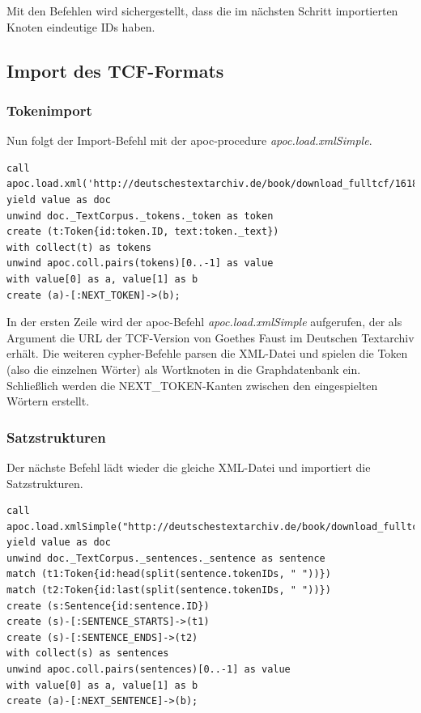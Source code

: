 Mit den Befehlen wird sichergestellt, dass die im nächsten Schritt
importierten Knoten eindeutige IDs haben.

\hypertarget{import-des-tcf-formats}{%
\subsection{Import des TCF-Formats}\label{import-des-tcf-formats}}

\hypertarget{tokenimport}{%
\subsubsection{Tokenimport}\label{tokenimport}}

Nun folgt der Import-Befehl mit der apoc-procedure
\emph{apoc.load.xmlSimple}.

\begin{verbatim}
call apoc.load.xml('http://deutschestextarchiv.de/book/download_fulltcf/16181') yield value as doc
unwind doc._TextCorpus._tokens._token as token
create (t:Token{id:token.ID, text:token._text})
with collect(t) as tokens
unwind apoc.coll.pairs(tokens)[0..-1] as value
with value[0] as a, value[1] as b
create (a)-[:NEXT_TOKEN]->(b);
\end{verbatim}

In der ersten Zeile wird der apoc-Befehl \emph{apoc.load.xmlSimple}
aufgerufen, der als Argument die URL der TCF-Version von Goethes Faust
im Deutschen Textarchiv erhält. Die weiteren cypher-Befehle parsen die
XML-Datei und spielen die Token (also die einzelnen Wörter) als
Wortknoten in die Graphdatenbank ein. Schließlich werden die
NEXT\_TOKEN-Kanten zwischen den eingespielten Wörtern erstellt.

\hypertarget{satzstrukturen}{%
\subsubsection{Satzstrukturen}\label{satzstrukturen}}

Der nächste Befehl lädt wieder die gleiche XML-Datei und importiert die
Satzstrukturen.

\begin{verbatim}
call apoc.load.xmlSimple("http://deutschestextarchiv.de/book/download_fulltcf/16181") yield value as doc
unwind doc._TextCorpus._sentences._sentence as sentence
match (t1:Token{id:head(split(sentence.tokenIDs, " "))})
match (t2:Token{id:last(split(sentence.tokenIDs, " "))})
create (s:Sentence{id:sentence.ID})
create (s)-[:SENTENCE_STARTS]->(t1)
create (s)-[:SENTENCE_ENDS]->(t2)
with collect(s) as sentences
unwind apoc.coll.pairs(sentences)[0..-1] as value
with value[0] as a, value[1] as b
create (a)-[:NEXT_SENTENCE]->(b);
\end{verbatim}

